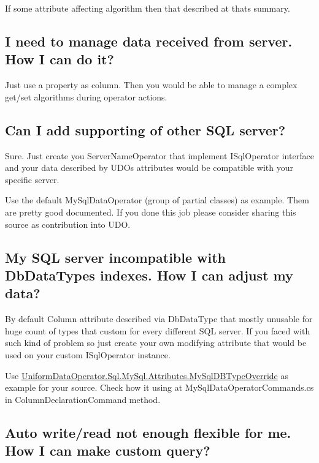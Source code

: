 If some attribute affecting algorithm then that described at that\textquotesingle{}s summary.

\subsection*{I need to manage data received from server. How I can do it?}

Just use a property as column. Then you would be able to manage a complex get/set algorithms during operator actions.

\subsection*{Can I add supporting of other S\+QL server?}

Sure. Just create you Server\+Name\+Operator that implement I\+Sql\+Operator interface and your data described by U\+DO\textquotesingle{}s attributes would be compatible with your specific server.

Use the default My\+Sql\+Data\+Operator (group of partial classes) as example. Them are pretty good documented. If you done this job please consider sharing this source as contribution into U\+DO.

\subsection*{My S\+QL server incompatible with Db\+Data\+Type\textquotesingle{}s indexes. How I can adjust my data?}

By default {\ttfamily Column} attribute described via {\ttfamily Db\+Data\+Type} that mostly unusable for huge count of types that custom for every different S\+QL server. If you faced with such kind of problem so just create your own modifying attribute that would be used on your custom {\ttfamily I\+Sql\+Operator} instance.

Use {\ttfamily \mbox{\hyperlink{class_uniform_data_operator_1_1_sql_1_1_my_sql_1_1_attributes_1_1_my_sql_d_b_type_override}{Uniform\+Data\+Operator.\+Sql.\+My\+Sql.\+Attributes.\+My\+Sql\+D\+B\+Type\+Override}}} as example for your source. Check how it using at {\ttfamily My\+Sql\+Data\+Operator\+Commands.\+cs} in {\ttfamily Column\+Declaration\+Command} method.

\subsection*{Auto write/read not enough flexible for me. How I can make custom query?}

